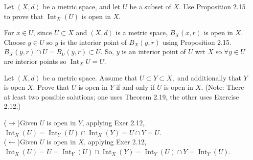 \documentclass[12pt,letterpaper,boxed]{hmcpset}
\DeclareMathOperator{\Int}{Int}
\begin{document}
\begin{problem}[Exercise 2.16.]
Let $(X, d)$ be a metric space, and let $U$ be a subset of $X$. Use Proposition 2.15 to prove that $\Int_{X}(U)$ is open in $X$.
\end{problem}
\begin{solution}
For $x \in U$, since $U\subset X$ and $(X,d)$ is a metric space, $B_X(x, r)$ is open in $X$. Choose $y\in U$ so $y$ is the interior point of $B_X(y,r)$ using Proposition 2.15. $B_X(y, r)\cap U = B_U(y, r) \subset U.$ So, $y$ is an interior point of $U$ wrt $X$ so $\forall y \in U$ are interior points so $\Int_X U = U.$
\end{solution}

\begin{problem}[Exercise 2.20.]
Let $(X, d)$ be a metric space. Assume that $U\subset Y\subset X,$ and additionally that $Y$ is open $X$. Prove that $U$ is open in $Y$ if and only if $U$ is open in $X$. (Note: There at least two possible solutions; one uses Theorem 2.19, the other uses Exercise 2.12.)
\end{problem}
\begin{solution}
($\rightarrow$)Given $U$ is open in $Y$, applying Exer 2.12, $\Int_X(U) = \Int_Y(U)\cap\Int_X(Y) = U\cap Y = U$. \\
($\leftarrow$)Given $U$ is open in $X$, applying Exer 2.12, $\Int_X(U) = U = \Int_Y(U)\cap\Int_X(Y) = \Int_Y(U)\cap Y=\Int_Y(U)$. \\
 \end{solution}
\end{document}
